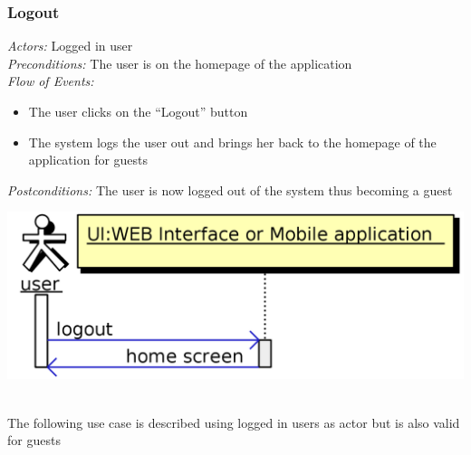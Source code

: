 \documentclass{article}
\begin{document}
\subsubsection{Logout}
\textit{Actors:} Logged in user
\\\textit{Preconditions:} The user is on the homepage of the application
\\\textit{Flow of Events:}
\begin{itemize}
	\item  The user clicks on the ``Logout'' button
	\item  The system logs the user out and brings her back to the homepage of the application for guests
\end{itemize}
\textit{Postconditions:} The user is now logged out of the system thus becoming a guest
\begin{center}	
	\includegraphics[width=\textwidth,keepaspectratio]{Sequence-Diagrams/logout}
\end{center}
\-\\
The following use case is described using logged in users as actor but is also valid for guests
\end{document}
